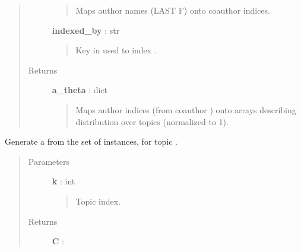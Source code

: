 \documentclass[letterpaper,10pt,english]{sphinxmanual}
\begin{document}
\begin{fulllineitems}
\begin{fulllineitems}
\begin{quote}
\begin{description}
\begin{quote}
Maps author names (LAST F) onto coauthor  indices.
\end{quote}

\textbf{indexed\_by} : str
\begin{quote}

Key in {\hyperref[tethne.classes.paper:tethne.classes.paper.Paper]{}} used to index {\hyperref[tethne.classes.corpus:tethne.classes.corpus.Corpus]{}}.
\end{quote}

\item[{Returns}] \leavevmode
\textbf{a\_theta} : dict
\begin{quote}

Maps author indices (from coauthor ) onto arrays
describing distribution over topics (normalized to 1).
\end{quote}

\end{description}\end{quote}

\end{fulllineitems}


\begin{fulllineitems}
\label{tethne.model.managers.tap:tethne.model.managers.tap.TAPModelManager.graph_collection}
Generate a {\hyperref[tethne.classes.graphcollection:tethne.classes.graphcollection.GraphCollection]{}} from the set of 
instances, for topic .
\begin{quote}\begin{description}
\item[{Parameters}] \leavevmode
\textbf{k} : int
\begin{quote}

Topic index.
\end{quote}

\item[{Returns}] \leavevmode
\textbf{C} : {\hyperref[tethne.classes.graphcollection:tethne.classes.graphcollection.GraphCollection]{}}

\end{description}\end{quote}

\end{fulllineitems}


\end{fulllineitems}
\end{document}
